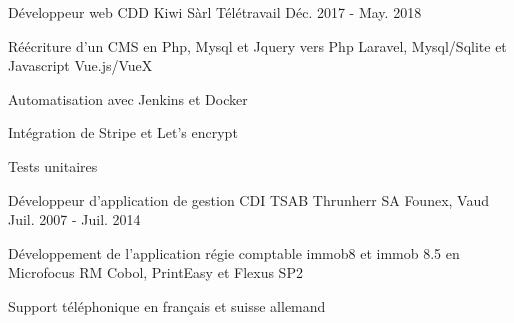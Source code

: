 

\begin{cventries}

  \cventry
    {Développeur web CDD} %
    {Kiwi Sàrl} %
    {Télétravail} %
    {Déc. 2017 - May. 2018} %
    {
      \begin{cvitems} %
        \item {Réécriture d'un CMS en Php, Mysql et Jquery vers Php Laravel, Mysql/Sqlite et Javascript Vue.js/VueX}
        \item {Automatisation avec Jenkins et Docker}
        \item {Intégration de Stripe et Let's encrypt}
        \item {Tests unitaires}
      \end{cvitems}
    }

  \cventry
    {Développeur d'application de gestion CDI} %
    {TSAB Thrunherr SA} %
    {Founex, Vaud} %
    {Juil. 2007 - Juil. 2014} %
    {
      \begin{cvitems} %
        \item {Développement de l'application régie comptable immob8 et immob 8.5 en Microfocus RM Cobol, PrintEasy et Flexus SP2}
        \item {Support téléphonique en français et suisse allemand}
      \end{cvitems}
    }

\end{cventries}
